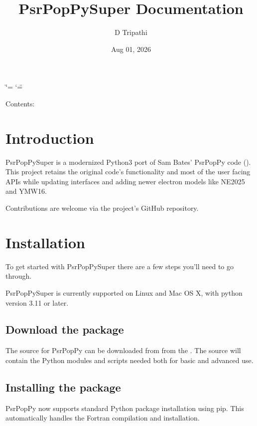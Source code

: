 \documentclass[letterpaper,10pt,english]{sphinxmanual}
\title{PsrPopPySuper Documentation}
\date{Aug 01, 2026}
\author{D Tripathi}
\begin{document}
\ifdefined\shorthandoff
  \ifnum\catcode`\=\string=\active\shorthandoff{=}\fi
  \ifnum\catcode`\"=\active{}\fi
\fi

\pagestyle{empty}
\sphinxmaketitle
\pagestyle{plain}
\sphinxtableofcontents
\pagestyle{normal}
\label{\detokenize{index::doc}}


\sphinxAtStartPar
Contents:

\sphinxstepscope


\chapter{Introduction}
\label{\detokenize{introduction:introduction}}\label{\detokenize{introduction::doc}}
\sphinxAtStartPar
PsrPopPySuper is a modernized Python3 port of Sam Bates’ PsrPopPy code ().
This project retains the original code’s functionality and most of the user facing APIs while updating interfaces and adding newer
electron models like NE2025 and YMW16.

\sphinxAtStartPar
Contributions are welcome via the project’s GitHub repository.

\sphinxstepscope


\chapter{Installation}
\label{\detokenize{installation:installation}}\label{\detokenize{installation:id1}}\label{\detokenize{installation::doc}}
\sphinxAtStartPar
To get started with PsrPopPySuper there are a few steps you’ll need to
go through.

\sphinxAtStartPar
PsrPopPySuper is currently supported on Linux and Mac OS X, with python
version 3.11 or later.


\section{Download the package}
\label{\detokenize{installation:download-the-package}}\label{\detokenize{installation:download-package}}
\sphinxAtStartPar
The source for PsrPopPy can be downloaded from 
from the .
The source will contain the Python modules and scripts needed both for
basic and advanced use.


\section{Installing the package}
\label{\detokenize{installation:installing-the-package}}\label{\detokenize{installation:installing-package}}
\sphinxAtStartPar
PsrPopPy now supports standard Python package installation using pip.
This automatically handles the Fortran compilation and installation.
\end{document}
